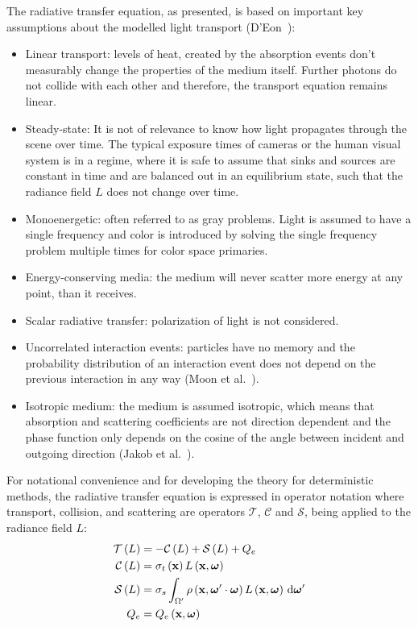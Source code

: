 The radiative transfer equation, as presented, is based on important key assumptions about the modelled light transport (D'Eon~\cite{DEon14}):
\begin{itemize}
\item Linear transport: levels of heat, created by the absorption events don't measurably change the properties of the medium itself. Further photons do not collide with each other and therefore, the transport equation remains linear.
\item Steady-state: It is not of relevance to know how light propagates through the scene over time. The typical exposure times of cameras or the human visual system is in a regime, where it is safe to assume that sinks and sources are constant in time and are balanced out in an equilibrium state, such that the radiance field $L$ does not change over time.
\item Monoenergetic: often referred to as gray problems. Light is assumed to have a single frequency and color is introduced by solving the single frequency problem multiple times for color space primaries.
\item Energy-conserving media: the medium will never scatter more energy at any point, than it receives.
\item Scalar radiative transfer: polarization of light is not considered.
\item Uncorrelated interaction events: particles have no memory and the probability distribution of an interaction event does not depend on the previous interaction in any way (Moon et al.~\cite{Moon07}).
\item Isotropic medium: the medium is assumed isotropic, which means that absorption and scattering coefficients are not direction dependent and the phase function only depends on the cosine of the angle between incident and outgoing direction (Jakob et al.~\cite{Jakob10}).
\end{itemize}

For notational convenience and for developing the theory for deterministic methods, the radiative transfer equation is expressed in operator notation where transport, collision, and scattering are operators $\mathcal{T}$, $\mathcal{C}$ and $\mathcal{S}$, being applied to the radiance field $L$:
\begin{align}
\mathcal{T}\left(L\right) &= -\mathcal{C}\left(L\right) + \mathcal{S}\left(L\right) + Q_e
\label{eq:rte_operator_notation}
\\
\mathcal{C}\left(L\right) &= \sigma_t\left(\boldsymbol{\mathbf{x}}\right) L\left(\boldsymbol{\mathbf{x}}, \boldsymbol{\mathbf{\omega}} \right)
\nonumber
\\
\mathcal{S}\left(L\right) &= \sigma_s \int_{\Omega'}\rho\left(\boldsymbol{\mathbf{x}}, \boldsymbol{\mathbf{\omega}}'\cdot\boldsymbol{\mathbf{\omega}}\right)L\left(\boldsymbol{\mathbf{x}}, \boldsymbol{\mathbf{\omega}} \right)\,\mathrm{d}\boldsymbol{\mathbf{\omega}}'
\nonumber
\\
Q_e &= Q_e\left(\boldsymbol{\mathbf{x}}, \boldsymbol{\mathbf{\omega}}\right)
\nonumber
\end{align}

